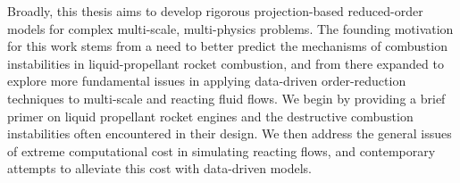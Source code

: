 
Broadly, this thesis aims to develop rigorous projection-based reduced-order models for complex multi-scale, multi-physics problems. The founding motivation for this work stems from a need to better predict the mechanisms of combustion instabilities in liquid-propellant rocket combustion, and from there expanded to explore more fundamental issues in applying data-driven order-reduction techniques to multi-scale and reacting fluid flows. We begin by providing a brief primer on liquid propellant rocket engines and the destructive combustion instabilities often encountered in their design. We then address the general issues of extreme computational cost in simulating reacting flows, and contemporary attempts to alleviate this cost with data-driven models.
